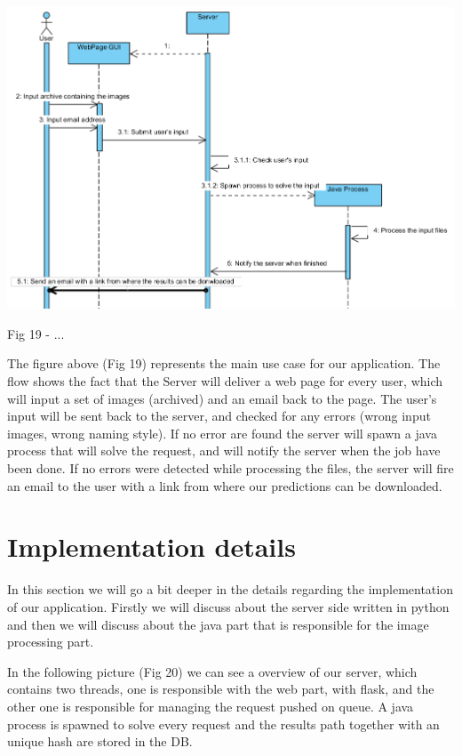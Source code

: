 \documentclass[12pt, a4paper]{report}
\begin{document}
\bigskip
\includegraphics[scale=0.7, center]{FlowCase.png}
\begin{center}
Fig 19 - ... 
\end{center}
\par 

The figure above (Fig 19) represents the main use case for our application. The flow shows the fact that the Server will deliver a web page for every user, which will input a set of images (archived) and an email back to the page. The user's input will be sent back to the server, and checked for any errors (wrong input images, wrong naming style). If no error are found the server will spawn a java process that will solve the request, and will notify the server when the job have been done. If no errors were detected while processing the files, the server will fire an email to the user with a link from where our predictions can be downloaded.


\section{Implementation details}
\quad
In this section we will go a bit deeper in the details regarding the implementation of our application. Firstly we will discuss about the server side written in python and then we will discuss about the java part that is responsible for the image processing part.
\par 

In the following picture (Fig 20) we can see a overview of our server, which contains two threads, one is responsible with the web part, with flask, and the other one is responsible for managing the request pushed on queue. A java process is spawned to solve every request and the results path together with an unique hash are stored in the DB.
\par 
\end{document}
